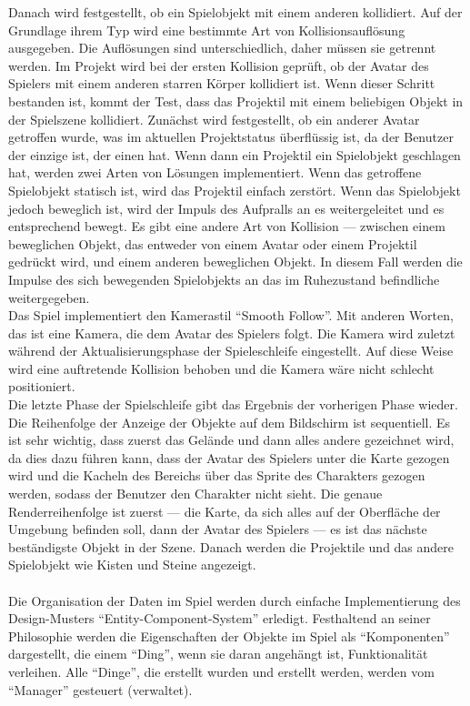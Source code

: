 \documentclass[
  10pt,
  a4paper,
  oneside,
  headers,
  headinclude,
  footinclude,
  BCOR5mm,
]{article}
\begin{document}
Danach wird festgestellt, ob ein Spielobjekt mit einem anderen kollidiert. Auf der Grundlage ihrem Typ wird eine bestimmte Art von Kollisionsauflösung ausgegeben. Die Auflösungen sind unterschiedlich, daher müssen sie getrennt werden. Im Projekt wird bei der ersten Kollision geprüft, ob der Avatar des Spielers mit einem anderen starren Körper kollidiert ist. Wenn dieser Schritt bestanden ist, kommt der Test, dass das Projektil mit einem beliebigen Objekt in der Spielszene kollidiert. Zunächst wird festgestellt, ob ein anderer Avatar getroffen wurde, was im aktuellen Projektstatus überflüssig ist, da der Benutzer der einzige ist, der einen hat. Wenn dann ein Projektil ein Spielobjekt geschlagen hat, werden zwei Arten von Lösungen implementiert. Wenn das getroffene Spielobjekt statisch ist, wird das Projektil einfach zerstört. Wenn das Spielobjekt jedoch beweglich ist, wird der Impuls des Aufpralls an es weitergeleitet und es entsprechend bewegt. Es gibt eine andere Art von Kollision --- zwischen einem beweglichen Objekt, das entweder von einem Avatar oder einem Projektil gedrückt wird, und einem anderen beweglichen Objekt. In diesem Fall werden die Impulse des sich bewegenden Spielobjekts an das im Ruhezustand befindliche weitergegeben.\\
Das Spiel implementiert den Kamerastil ``Smooth Follow''. Mit anderen Worten, das ist eine Kamera, die dem Avatar des Spielers folgt. Die Kamera wird zuletzt während der Aktualisierungsphase der Spieleschleife eingestellt. Auf diese Weise wird eine auftretende Kollision behoben und die Kamera wäre nicht schlecht positioniert.\\
Die letzte Phase der Spielschleife gibt das Ergebnis der vorherigen Phase wieder. Die Reihenfolge der Anzeige der Objekte auf dem Bildschirm ist sequentiell. Es ist sehr wichtig, dass zuerst das Gelände und dann alles andere gezeichnet wird, da dies dazu führen kann, dass der Avatar des Spielers unter die Karte gezogen wird und die Kacheln des Bereichs über das Sprite des Charakters gezogen werden, sodass der Benutzer den Charakter nicht sieht. Die genaue Renderreihenfolge ist zuerst --- die Karte, da sich alles auf der Oberfläche der Umgebung befinden soll, dann der Avatar des Spielers --- es ist das nächste beständigste Objekt in der Szene. Danach werden die Projektile und das andere Spielobjekt wie Kisten und Steine angezeigt.
\paragraph{}
Die Organisation der Daten im Spiel werden durch einfache Implementierung des Design-Musters ``Entity-Component-System'' erledigt. Festhaltend an seiner Philosophie werden die Eigenschaften der Objekte im Spiel als ``Komponenten'' dargestellt, die einem ``Ding'', wenn sie daran angehängt ist, Funktionalität verleihen. Alle ``Dinge'', die erstellt wurden und erstellt werden, werden vom ``Manager'' gesteuert (verwaltet).
\end{document}
